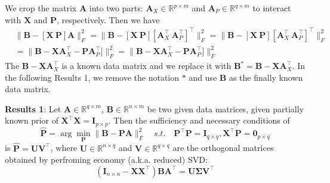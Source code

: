 \documentclass[titlepage,11pt,twoside]{article}
\begin{document}
We crop the matrix $\mathbf{A}$ into two parts: $\mathbf{A}_{X}\in\mathbb{R}^{p\times m}$ and $\mathbf{A}_{P}\in\mathbb{R}^{q\times m}$ to interact with $\mathbf{X}$ and $\mathbf{P}$, respectively. Then we have 
\begin{equation}
\begin{split}
&
\|\mathbf{B}-[\mathbf{X}\ \mathbf{P}]\mathbf{A}\|_{F}^{2}
=\|\mathbf{B}-[\mathbf{X}\ \mathbf{P}][\mathbf{A}_{X}^{\top}\ \mathbf{A}_{P}^{\top}]^{\top}\|_{F}^{2}
=\|\mathbf{B}-[\mathbf{X}\ \mathbf{P}][\mathbf{A}_{X}^{\top}\ \mathbf{A}_{P}^{\top}]^{\top}\|_{F}^{2}
\\
&
=\|\mathbf{B}-\mathbf{X}\mathbf{A}_{X}^{\top} - \mathbf{P}\mathbf{A}_{P}^{\top}]\|_{F}^{2}
=\|\mathbf{B}-\mathbf{X}\mathbf{A}_{X}^{\top} - \mathbf{P}\mathbf{A}_{P}^{\top}]\|_{F}^{2}
\end{split}
\end{equation}
The $\mathbf{B}-\mathbf{X}\mathbf{A}_{X}^{\top}$ is a known data matrix and we replace it with 
$\mathbf{B}^{*}=\mathbf{B}-\mathbf{X}\mathbf{A}_{X}^{\top}$. In the following Results 1, we remove the notation $*$ and use $\mathbf{B}$ as the finally known data matrix.

\textbf{Results 1}: Let $\mathbf{A}\in \mathbb{R}^{q\times m}$, $\mathbf{B}\in \mathbb{R}^{n\times m}$ be two given data matrices, given partially known prior of $\mathbf{X}^{\top}\mathbf{X}=\mathbf{I}_{p\times p}$. Then the sufficiency and necessary conditions of
\begin{equation}
\mathbf{\hat{P}}=\arg\min_{\mathbf{P}}\|\mathbf{B}-\mathbf{P}\mathbf{A}\|_{F}^{2}
\quad
s.t.
\quad
\mathbf{P}^{\top}\mathbf{P} = \mathbf{I}_{q\times q}, \mathbf{X}^{\top}\mathbf{P} = \mathbf{0}_{p\times q} 
\end{equation}
is $\mathbf{\hat{P}} = \mathbf{U}\mathbf{V}^{\top}$, where $\mathbf{U}\in \mathbb{R}^{n\times q}$ and $\mathbf{V}\in \mathbb{R}^{q\times q}$ are the orthogonal matrices obtained by perfroming economy (a.k.a. reduced) SVD:
\begin{equation}
(\mathbf{I}_{n\times n}-\mathbf{X}\mathbf{X}^{\top})\mathbf{B}\mathbf{A}^{\top} = \mathbf{U}\mathbf{\mathbf{\Sigma}}\mathbf{V}^{\top}
\end{equation}
\end{document}
